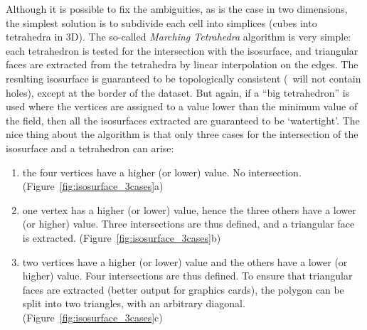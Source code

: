Although it is possible to fix the ambiguities, as is the case in two dimensions, the simplest solution is to subdivide each cell into simplices (cubes into tetrahedra in 3D). 
The so-called \emph{Marching Tetrahedra} algorithm is very simple: each tetrahedron is tested for the intersection with the isosurface, and triangular faces are extracted from the tetrahedra by linear interpolation on the edges. 
The resulting isosurface is guaranteed to be topologically consistent (\ie\ will not contain holes), except at the border of the dataset. 
But again, if a ``big tetrahedron''%
is used where the vertices are assigned to a value lower than the minimum value of the field, then all the isosurfaces extracted are guaranteed to be `watertight'. 
The nice thing about the algorithm is that only three cases for the intersection of the isosurface and a tetrahedron can arise:
\begin{enumerate}
  \item the four vertices have a higher (or lower) value. No intersection. (Figure~\ref{fig:isosurface_3cases}a)
  \item one vertex has a higher (or lower) value, hence the three others have a lower (or higher) value. Three intersections are thus defined, and a triangular face is extracted. (Figure~\ref{fig:isosurface_3cases}b)
  \item two vertices have a higher (or lower) value and the others have a lower (or higher) value. Four intersections are thus defined. To ensure that triangular faces are extracted (better output for graphics cards), the polygon can be split into two triangles, with an arbitrary diagonal. (Figure~\ref{fig:isosurface_3cases}c)
  \end{enumerate}
